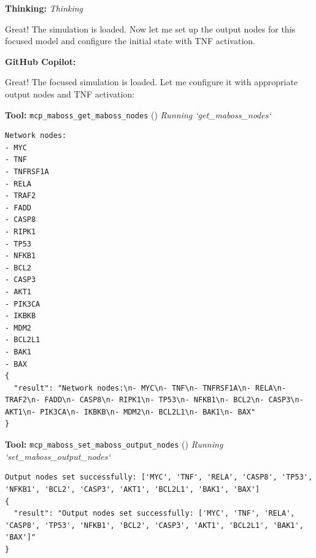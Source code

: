 \documentclass[11pt,a4paper]{article}
\begin{document}
\begin{thinkbox}
\textbf{Thinking:} \textit{Thinking}

Great! The simulation is loaded. Now let me set up the output nodes for this focused model and configure the initial state with TNF activation.

\end{thinkbox}
\begin{copilotbox}
\textbf{GitHub Copilot:}

Great! The focused simulation is loaded. Let me configure it with appropriate output nodes and TNF activation:

\end{copilotbox}
\begin{toolokbox}
\textbf{Tool:} \texttt{mcp\_maboss\_get\_maboss\_nodes} (\checkmark)
\textit{Running `get\_maboss\_nodes`}
\begin{lstlisting}
Network nodes:
- MYC
- TNF
- TNFRSF1A
- RELA
- TRAF2
- FADD
- CASP8
- RIPK1
- TP53
- NFKB1
- BCL2
- CASP3
- AKT1
- PIK3CA
- IKBKB
- MDM2
- BCL2L1
- BAK1
- BAX
{
  "result": "Network nodes:\n- MYC\n- TNF\n- TNFRSF1A\n- RELA\n- TRAF2\n- FADD\n- CASP8\n- RIPK1\n- TP53\n- NFKB1\n- BCL2\n- CASP3\n- AKT1\n- PIK3CA\n- IKBKB\n- MDM2\n- BCL2L1\n- BAK1\n- BAX"
}
\end{lstlisting}
\end{toolokbox}
\begin{toolokbox}
\textbf{Tool:} \texttt{mcp\_maboss\_set\_maboss\_output\_nodes} (\checkmark)
\textit{Running `set\_maboss\_output\_nodes`}
\begin{lstlisting}
Output nodes set successfully: ['MYC', 'TNF', 'RELA', 'CASP8', 'TP53', 'NFKB1', 'BCL2', 'CASP3', 'AKT1', 'BCL2L1', 'BAK1', 'BAX']
{
  "result": "Output nodes set successfully: ['MYC', 'TNF', 'RELA', 'CASP8', 'TP53', 'NFKB1', 'BCL2', 'CASP3', 'AKT1', 'BCL2L1', 'BAK1', 'BAX']"
}
\end{lstlisting}
\end{toolokbox}
\end{document}
